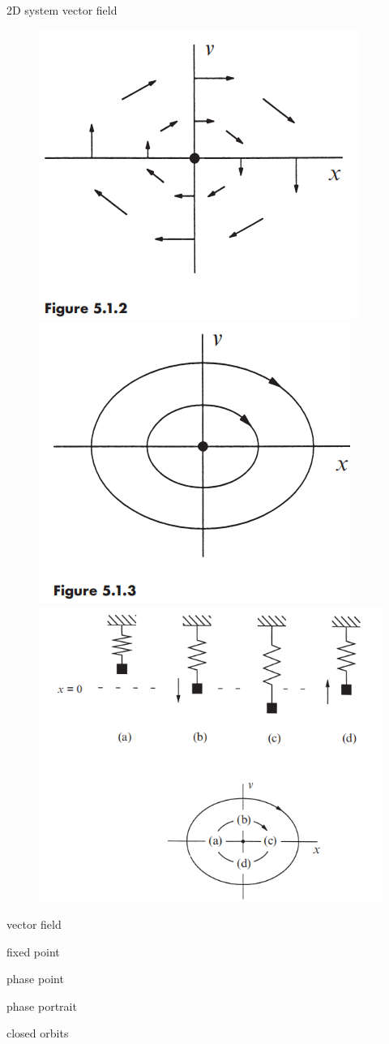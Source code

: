 \documentclass[9pt,aspectratio=43,mathserif,table]{beamer}
\begin{document}
\begin{frame}{2D system vector field}
  \begin{multicols}{2}
    \begin{figure}[!h]
      \centering
      \includegraphics[width=.3\textwidth]{fig/5.1.2 vecterfield.png}
      \includegraphics[width=.3\textwidth]{fig/5.1.3 phaseportrait.png}
      \includegraphics[width=.4\textwidth]{fig/5.1.4 phase chart.png}
    \end{figure}

    vector field

    fixed point

    phase point

    phase portrait

    closed orbits

  \end{multicols}
\end{frame}
\end{document}
